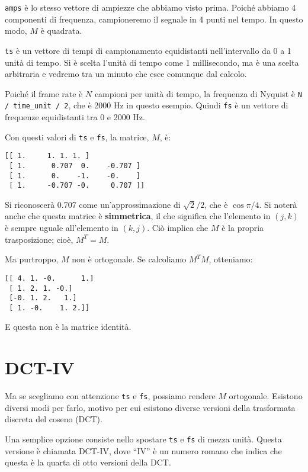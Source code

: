 \documentclass[12pt]{book} \usepackage[width=5.5in,height=8.5in, hmarginratio=3:2,vmarginratio=1:1]{geometry}
\begin{document}
{\tt amps} è lo stesso vettore di ampiezze che abbiamo visto prima. Poiché abbiamo 4 componenti di frequenza, campioneremo il segnale in 4 punti nel tempo. In questo modo, $M$ è quadrata.

{\tt ts} è un vettore di tempi di campionamento equidistanti nell'intervallo da 0 a 1 unità di tempo. Si è scelta l'unità di tempo come 1 millisecondo, ma è una scelta arbitraria e vedremo tra un minuto che esce comunque dal calcolo.

Poiché il frame rate è $N$ campioni per unità di tempo, la frequenza di Nyquist è \verb"N / time_unit / 2", che è 2000 Hz in questo esempio. Quindi {\tt fs} è un vettore di frequenze equidistanti tra 0 e 2000 Hz.

Con questi valori di {\tt ts} e {\tt fs}, la matrice, $M$, è:

\begin{verbatim} 
[[ 1.     1. 1. 1. ]
 [ 1.      0.707  0.    -0.707 ] 
 [ 1.      0.    -1.    -0.    ]
 [ 1.     -0.707 -0.     0.707 ]]
 \end{verbatim} 

Si riconoscerà 0.707 come un'approssimazione di $\sqrt{2}/2$, che è $\cos \pi/4$. Si noterà anche che questa matrice è {\bf simmetrica}, il che significa che l'elemento in $(j, k)$ è sempre uguale all'elemento in $(k, j)$. Ciò implica che $M$ è la propria trasposizione; cioè, $M^T = M$.

Ma purtroppo, $M$ non è ortogonale. Se calcoliamo $M^TM$, otteniamo:

\begin{verbatim} 
[[ 4. 1. -0.      1.]
 [ 1. 2. 1. -0.]
 [-0. 1. 2.   1.]
 [ 1. -0.    1. 2.]]
 \end{verbatim} 

E questa non è la matrice identità.

\section{DCT-IV} \label{dctiv} 

Ma se scegliamo con attenzione {\tt ts} e {\tt fs}, possiamo rendere $M$ ortogonale. Esistono diversi modi per farlo, motivo per cui esistono diverse versioni della trasformata discreta del coseno (DCT).

Una semplice opzione consiste nello spostare {\tt ts} e {\tt fs} di mezza unità. Questa versione è chiamata DCT-IV, dove ``IV'' è un numero romano che indica che questa è la quarta di otto versioni della DCT.
\end{document}
